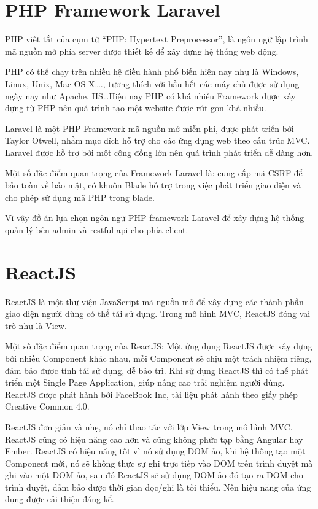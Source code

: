 \documentclass[../DoAn.tex]{subfiles}
\begin{document}
\section{PHP Framework Laravel}
\label{section:3.1}
PHP viết tắt của cụm từ “PHP: Hypertext Preprocessor”, là ngôn ngữ lập trình mã nguồn mở phía server được thiết kế để xây dựng hệ thống web động\cite{PHP}.

PHP có thể chạy trên nhiều hệ điều hành phổ biến hiện nay như là Windows, Linux, Unix, Mac OS X…., tương thích với hầu hết các máy chủ được sử dụng ngày nay như Apache, IIS…Hiện nay PHP có khá nhiều Framework được xây dựng từ PHP nên quá trình tạo một website được rút gọn khá nhiều. 

Laravel là một PHP Framework mã nguồn mở miễn phí, được phát triển bởi Taylor Otwell, nhằm mục đích hỗ trợ cho các ứng dụng web theo cấu trúc MVC\cite{Laravel}. Laravel được hỗ trợ bởi một cộng đồng lớn nên quá trình phát triển dễ dàng hơn. 

Một số đặc điểm quan trọng của Framework Laravel là: cung cấp mã CSRF để bảo toàn về bảo mật, có khuôn Blade hỗ trợ trong việc phát triển giao diện và cho phép sử dụng mã PHP trong blade.

Vì vậy đồ án lựa chọn ngôn ngữ PHP framework Laravel để xây dựng hệ thống quản lý bên admin và restful api cho phía client. 
\section{ReactJS}
\label{section:3.2}
ReactJS là một thư viện JavaScript mã nguồn mở để xây dựng các thành phần giao diện người dùng có thể tái sử dụng\cite{ReactJS}. Trong mô hình MVC, ReactJS đóng vai trò như là View.

Một số đặc điểm quan trọng của ReactJS: Một ứng dụng ReactJS được xây dựng bởi nhiều Component khác nhau, mỗi Component sẽ chịu một trách nhiệm riêng, đảm bảo được tính tái sử dụng, dễ bảo trì. Khi sử dụng ReactJS thì có thể phát triển một Single Page Application, giúp nâng cao trải nghiệm người dùng. ReactJS được phát hành bởi FaceBook Inc, tài liệu phát hành theo giấy phép Creative Common 4.0.

ReactJS đơn giản và nhẹ, nó chỉ thao tác với lớp View trong mô hình MVC. ReactJS cũng có hiệu năng cao hơn và cũng không phức tạp bằng Angular hay Ember. ReactJS có hiệu năng tốt vì nó sử dụng DOM ảo, khi hệ thống tạo một Component mới, nó sẽ không thực sự ghi trực tiếp vào DOM trên trình duyệt mà ghi vào một DOM ảo, sau đó ReactJS sẽ sử dụng DOM ảo đó tạo ra DOM cho trình duyệt, đảm bảo được thời gian đọc/ghi là tối thiểu. Nên hiệu năng của ứng dụng được cải thiện đáng kể. 
\end{document}
